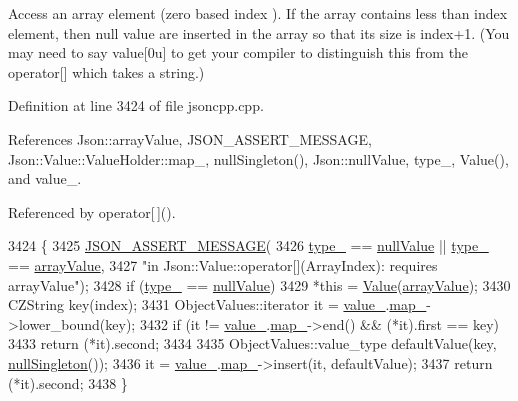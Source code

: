 Access an array element (zero based index ). If the array contains less than index element, then null value are inserted in the array so that its size is index+1. (You may need to say \textquotesingle{}value\mbox{[}0u\mbox{]}\textquotesingle{} to get your compiler to distinguish this from the operator\mbox{[}\mbox{]} which takes a string.) 

Definition at line 3424 of file jsoncpp.\+cpp.



References Json\+::array\+Value, J\+S\+O\+N\+\_\+\+A\+S\+S\+E\+R\+T\+\_\+\+M\+E\+S\+S\+A\+GE, Json\+::\+Value\+::\+Value\+Holder\+::map\+\_\+, null\+Singleton(), Json\+::null\+Value, type\+\_\+, Value(), and value\+\_\+.



Referenced by operator\mbox{[}$\,$\mbox{]}().


\begin{DoxyCode}
3424                                          \{
3425   \hyperlink{json_8h_ad7facdeeca0f495765e3b204c265eadb}{JSON\_ASSERT\_MESSAGE}(
3426       \hyperlink{class_json_1_1_value_abd222c2536dc88bf330dedcd076d2356}{type\_} == \hyperlink{namespace_json_a7d654b75c16a57007925868e38212b4ea7d9899633b4409bd3fc107e6737f8391}{nullValue} || \hyperlink{class_json_1_1_value_abd222c2536dc88bf330dedcd076d2356}{type\_} == \hyperlink{namespace_json_a7d654b75c16a57007925868e38212b4eadc8f264f36b55b063c78126b335415f4}{arrayValue},
3427       \textcolor{stringliteral}{"in Json::Value::operator[](ArrayIndex): requires arrayValue"});
3428   \textcolor{keywordflow}{if} (\hyperlink{class_json_1_1_value_abd222c2536dc88bf330dedcd076d2356}{type\_} == \hyperlink{namespace_json_a7d654b75c16a57007925868e38212b4ea7d9899633b4409bd3fc107e6737f8391}{nullValue})
3429     *\textcolor{keyword}{this} = \hyperlink{class_json_1_1_value_ada6ba1369448fb0240bccc36efaa46f7}{Value}(\hyperlink{namespace_json_a7d654b75c16a57007925868e38212b4eadc8f264f36b55b063c78126b335415f4}{arrayValue});
3430   CZString key(index);
3431   ObjectValues::iterator it = \hyperlink{class_json_1_1_value_aef578244546212705b9f81eb84d7e151}{value\_}.\hyperlink{union_json_1_1_value_1_1_value_holder_a1e7a5b86d4f52234f55c847ad1ce389a}{map\_}->lower\_bound(key);
3432   \textcolor{keywordflow}{if} (it != \hyperlink{class_json_1_1_value_aef578244546212705b9f81eb84d7e151}{value\_}.\hyperlink{union_json_1_1_value_1_1_value_holder_a1e7a5b86d4f52234f55c847ad1ce389a}{map\_}->end() && (*it).first == key)
3433     \textcolor{keywordflow}{return} (*it).second;
3434 
3435   ObjectValues::value\_type defaultValue(key, \hyperlink{class_json_1_1_value_af2f124567acc35d021a424e53ebdfcab}{nullSingleton}());
3436   it = \hyperlink{class_json_1_1_value_aef578244546212705b9f81eb84d7e151}{value\_}.\hyperlink{union_json_1_1_value_1_1_value_holder_a1e7a5b86d4f52234f55c847ad1ce389a}{map\_}->insert(it, defaultValue);
3437   \textcolor{keywordflow}{return} (*it).second;
3438 \}
\end{DoxyCode}
\mbox{\label{class_json_1_1_value_ac9182982c361e0ab621134d406e5f250}} 
